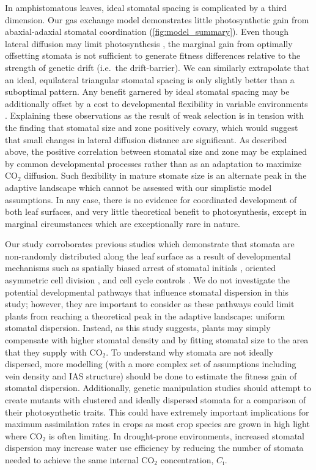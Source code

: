 \documentclass[webpdf,large,modern,unnumsec,namedate]{oup-authoring-template}
\begin{document}
In amphistomatous leaves, ideal stomatal spacing is complicated by a
third dimension. Our gas exchange model demonstrates little
photosynthetic gain from abaxial-adaxial stomatal coordination
(\autoref{fig:model_summary}). Even though lateral diffusion may limit
photosynthesis \citep{morison_lateral_2005}, the marginal gain from
optimally offsetting stomata is not sufficient to generate fitness
differences relative to the strength of genetic drift (i.e.~the
drift-barrier). We can similarly extrapolate that an ideal, equilateral
triangular stomatal spacing is only slightly better than a suboptimal
pattern. Any benefit garnered by ideal stomatal spacing may be
additionally offset by a cost to developmental flexibility in variable
environments
\citep{pillitteri_mechanisms_2012, baillie_developmental_2020}.
Explaining these observations as the result of weak selection is in
tension with the finding that stomatal size and zone positively covary,
which would suggest that small changes in lateral diffusion distance are
significant. As described above, the positive correlation between
stomatal size and zone may be explained by common developmental
processes rather than as an adaptation to maximize CO\(_2\) diffusion.
Such flexibility in mature stomate size is an alternate peak in the
adaptive landscape which cannot be assessed with our simplistic model
assumptions. In any case, there is no evidence for coordinated
development of both leaf surfaces, and very little theoretical benefit
to photosynthesis, except in marginal circumstances which are
exceptionally rare in nature.

Our study corroborates previous studies which demonstrate that stomata
are non-randomly distributed along the leaf surface as a result of
developmental mechanisms such as spatially biased arrest of stomatal
initials \citep{boetsch_arrest_1995}, oriented asymmetric cell division
\citep{geisler_oriented_2000}, and cell cycle controls
\citep{croxdale_stomatal_2000}. We do not investigate the potential
developmental pathways that influence stomatal dispersion in this study;
however, they are important to consider as these pathways could limit
plants from reaching a theoretical peak in the adaptive landscape:
uniform stomatal dispersion. Instead, as this study suggests, plants may
simply compensate with higher stomatal density and by fitting stomatal
size to the area that they supply with CO\(_2\). To understand why
stomata are not ideally dispersed, more modelling (with a more complex
set of assumptions including vein density and IAS structure) should be
done to estimate the fitness gain of stomatal dispersion. Additionally,
genetic manipulation studies should attempt to create mutants with
clustered and ideally dispersed stomata for a comparison of their
photosynthetic traits. This could have extremely important implications
for maximum assimilation rates in crops as most crop species are grown
in high light where CO\(_2\) is often limiting. In drought-prone
environments, increased stomatal dispersion may increase water use
efficiency by reducing the number of stomata needed to achieve the same
internal CO\(_2\) concentration, \(C_\text{i}\).
\end{document}
